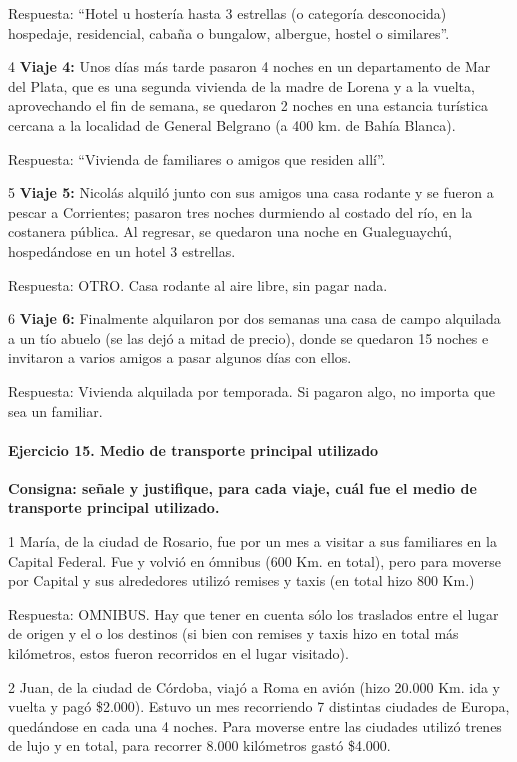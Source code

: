\documentclass[
  openany]{book}
\begin{document}
Respuesta: ``Hotel u hostería hasta 3 estrellas (o categoría desconocida) hospedaje, residencial, cabaña o bungalow, albergue, hostel o similares''.

4 \textbf{Viaje 4:} Unos días más tarde pasaron 4 noches en un departamento de Mar del Plata, que es una segunda vivienda de la madre de Lorena y a la vuelta, aprovechando el fin de semana, se quedaron 2 noches en una estancia turística cercana a la localidad de General Belgrano (a 400 km. de Bahía Blanca).

Respuesta: ``Vivienda de familiares o amigos que residen allí''.

5 \textbf{Viaje 5:} Nicolás alquiló junto con sus amigos una casa rodante y se fueron a pescar a Corrientes; pasaron tres noches durmiendo al costado del río, en la costanera pública. Al regresar, se quedaron una noche en Gualeguaychú, hospedándose en un hotel 3 estrellas.

Respuesta: OTRO. Casa rodante al aire libre, sin pagar nada.

6 \textbf{Viaje 6:} Finalmente alquilaron por dos semanas una casa de campo alquilada a un tío abuelo (se las dejó a mitad de precio), donde se quedaron 15 noches e invitaron a varios amigos a pasar algunos días con ellos.

Respuesta: Vivienda alquilada por temporada. Si pagaron algo, no importa que sea un familiar.

\hypertarget{ejercicio-15.-medio-de-transporte-principal-utilizado-1}{%
\paragraph{Ejercicio 15. Medio de transporte principal utilizado}\label{ejercicio-15.-medio-de-transporte-principal-utilizado-1}}

\textbf{Consigna: señale y justifique, para cada viaje, cuál fue el medio de transporte principal utilizado.}

1 María, de la ciudad de Rosario, fue por un mes a visitar a sus familiares en la Capital Federal. Fue y volvió en ómnibus (600 Km. en total), pero para moverse por Capital y sus alrededores utilizó remises y taxis (en total hizo 800 Km.)

Respuesta: OMNIBUS. Hay que tener en cuenta sólo los traslados entre el lugar de origen y el o los destinos (si bien con remises y taxis hizo en total más kilómetros, estos fueron recorridos en el lugar visitado).

2 Juan, de la ciudad de Córdoba, viajó a Roma en avión (hizo 20.000 Km. ida y vuelta y pagó \$2.000). Estuvo un mes recorriendo 7 distintas ciudades de Europa, quedándose en cada una 4 noches. Para moverse entre las ciudades utilizó trenes de lujo y en total, para recorrer 8.000 kilómetros gastó \$4.000.
\end{document}
